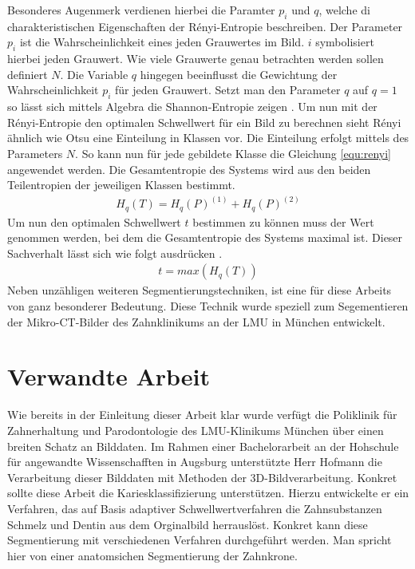 Besonderes Augenmerk verdienen hierbei die Paramter $p_{i}$ und $q$, welche di charakteristischen
Eigenschaften der Rényi-Entropie beschreiben. Der Parameter $p_{i}$ ist die
Wahrscheinlichkeit eines jeden Grauwertes im Bild. $i$ symbolisiert hierbei jeden
Grauwert. Wie viele Grauwerte genau betrachten werden sollen definiert $N$. Die Variable
$q$ hingegen beeinflusst die Gewichtung der Wahrscheinlichkeit $p_{i}$ für jeden
Grauwert. Setzt man den Parameter $q$ auf $q = 1$ so lässt sich mittels Algebra
die Shannon-Entropie zeigen \citep[vgl.][K.2]{bromiley2004}. Um nun mit der
Rényi-Entropie den optimalen Schwellwert für ein Bild zu berechnen sieht Rényi
ähnlich wie Otsu eine Einteilung in Klassen vor. Die Einteilung erfolgt mittels des
Parameters $N$. So kann nun für jede gebildete Klasse die Gleichung
\ref{equ:renyi} angewendet werden. Die Gesamtentropie des Systems wird aus den beiden
Teilentropien der jeweiligen Klassen bestimmt\citep[vgl.][K. 2]{bromiley2004}.
\begin{align}
	H_{q}(T) = H_{q}(P)^{(1)}+ H_{q}(P)^{(2)}
\end{align}
Um nun den optimalen Schwellwert $t$ bestimmen zu können muss der Wert genommen
werden, bei dem die Gesamtentropie des Systems maximal ist. Dieser Sachverhalt
lässt sich wie folgt ausdrücken \citep[vgl.][K. 2]{bromiley2004}.
\begin{align}
	t = max(H_{q}(T))
\end{align}
Neben unzähligen weiteren Segmentierungstechniken, ist eine für diese Arbeits von
ganz besonderer Bedeutung. Diese Technik wurde speziell zum Segementieren der
Mikro-\ac{CT}-Bilder des Zahnklinikums an der \ac{LMU} in München entwickelt.

\pagebreak

\section{Verwandte Arbeit}
\label{sec:verwwandte_arbeit} Wie bereits in der Einleitung dieser Arbeit klar wurde
verfügt die Poliklinik für Zahnerhaltung und Parodontologie des \ac{LMU}-Klinikums
München über einen breiten Schatz an Bilddaten. Im Rahmen einer Bachelorarbeit an
der Hohschule für angewandte Wissenschafften in Augsburg unterstützte Herr Hofmann
die Verarbeitung dieser Bilddaten mit Methoden der 3D-Bildverarbeitung. Konkret
sollte diese Arbeit die Kariesklassifizierung unterstützen. Hierzu entwickelte er
ein Verfahren, das auf Basis adaptiver Schwellwertverfahren die Zahnsubstanzen
Schmelz und Dentin aus dem Orginalbild herrauslöst. Konkret kann diese Segmentierung
mit verschiedenen Verfahren durchgeführt werden. Man spricht hier von einer
anatomsichen Segmentierung der Zahnkrone.

